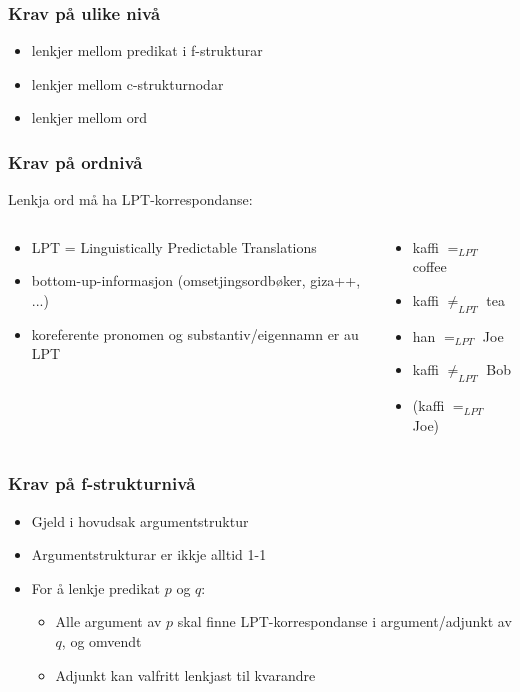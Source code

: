 \documentclass[xcolor=x11names,compress,bigger]{beamer}
\renewcommand{\(}{\begin{columns}}
\renewcommand{\)}{\end{columns}}
\newcommand{\<}[1]{\begin{column}{#1}}
\renewcommand{\>}{\end{column}}
\begin{document}
\begin{frame}\frametitle{Krav på ulike nivå}
  \begin{itemize}
  \item lenkjer mellom predikat i f-strukturar
  \item lenkjer mellom c-strukturnodar
  \item lenkjer mellom ord %
  \end{itemize}
\end{frame}

\begin{frame}\frametitle{Krav på ordnivå}
  Lenkja ord må ha LPT-korrespondanse:
  \begin{columns}
    \begin{column}{0.5\textwidth}
      \begin{itemize}
      \item LPT = Linguistically Predictable Translations
      \item bottom-up-informasjon (omsetjingsordbøker, giza++, ...)
      \item koreferente pronomen og substantiv/eigennamn er au LPT
      \end{itemize}
    \end{column}

    \begin{column}{0.5\textwidth}
      \begin{itemize}
      \item kaffi $=_{LPT}$ coffee
      \item kaffi $\neq_{LPT}$ tea
      \item han $=_{LPT}$ Joe
      \item kaffi $\neq_{LPT}$ Bob
      \item (kaffi $=_{LPT}$ Joe)
      \end{itemize}
    \end{column}
  \end{columns}
\end{frame}


\begin{frame}\frametitle{Krav på f-strukturnivå}
  \begin{itemize}
  \item Gjeld i hovudsak argumentstruktur
  

  \item Argumentstrukturar er ikkje alltid 1-1
  
  \item For å lenkje predikat $p$ og $q$:
    \begin{itemize}
    \item Alle argument av $p$ skal finne LPT-korrespondanse i
      argument/adjunkt av $q$, og omvendt
    \item Adjunkt kan valfritt lenkjast til kvarandre
    \end{itemize}
  \end{itemize}
\end{frame}
\end{document}
